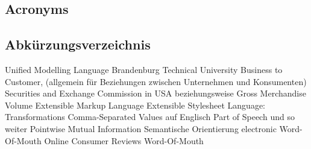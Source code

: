 %
%
%
%
\begin{en}
\chapter{Acronyms}
\end{en}
\begin{de}
\chapter{Abk\"urzungsverzeichnis}
\end{de}
\label{sec:acronyms}
%
\begin{acronym}[BTU]		%
%
%	
	 {Unified Modelling Language}
	 {Brandenburg Technical University}
     {Business to Customer, (allgemein für Beziehungen zwischen Unternehmen und Konsumenten)}
     {Securities and Exchange Commission in USA}
     {beziehungsweise}
     {Gross Merchandise Volume}
     {Extensible Markup Language}
     {Extensible Stylesheet Language: Transformations}
     {Comma-Separated Values}
     {auf Englisch}
     {Part of Speech}
     {und so weiter}
     {Pointwise Mutual Information}
     {Semantische Orientierung}
     {electronic Word-Of-Mouth}
     {Online Consumer Reviews}
     {Word-Of-Mouth}
%   
%	
%	
\end{acronym}
%
%
%
